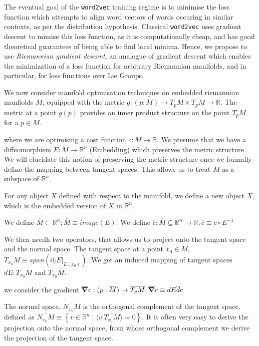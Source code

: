 \documentclass[11pt]{book}
\begin{document}

The eventual goal of the \texttt{word2vec} training regime is to minimise the loss function which attempts
to align word vectors of words occuring in similar contexts, as per the distribution hypothesis. Classical \texttt{word2vec}
uses gradient descent to mimise this loss function, as it is computationally cheap, and has good theoretical
guarantees of being able to find local minima. Hence, we propose to use \emph{Riemannian gradient descent}, an analogue
of gradient descent which enables the minimization of a loss function
for arbitrary Riemannian manifolds, and in particular, for loss functions over Lie Groups.

We now consider manifold optimisation techniques on embedded riemannian manfiolds $M$,
equipped with the metric $g: (p: M) \rightarrow T_p M  \times T_p M \rightarrow \mathbb R$.
The metric at a point $g(p)$ provides an inner product structure on the point $T_pM$
for a $p \in M$.

where we are optimising a cost function $c: M \rightarrow \mathbb R$.
We presume that we have a diffeomorphism $E: M \rightarrow \mathbb R^n$ (Embedding) which
preserves the metric structure. We will elucidate this notion of preserving
the metric structure once we formally define the mapping between tangent spaces.
This allows us to treat $M$ as a subspace of $\mathbb R^n$.

For any object $X$
defined with respect to the manifold, we define a new object $\overline X$, which
is the embedded version of $X$ in $\mathbb R^n$.

We define $\overline M \subset \mathbb R^n; \overline M \equiv image(E)$.
We define $\overline c: \overline M \subseteq \mathbb R^n \rightarrow \mathbb R; \overline c \equiv c \circ E^{-1}$

We then needh two operators, that allows us to project onto the tangent space
and the normal space. The tangent space at a point $x_0 \in M$, $\overline{T_{x_0} M} \equiv span(\partial_i E |_{E(x_0)})$.
We get an induced mapping of tangent spaces $dE: T_{x_0} M$ and $T_{x_0} \overline M$.

we consider the gradient
$\overline \grad c : (p: \overline M) \rightarrow \overline{T_p M}; \overline \grad c \equiv dE \overline dc$

The normal space,
$\overline{N_{x_0} M}$ is the orthogonal complement of the tangent space, defined
as $\overline{N_{x_0} M} \equiv \left\{ v \in \mathbb R^n \mid \langle v | \overline{T_{x_0} M} \rangle = 0 \right\}$.
It is often very easy to derive the projection onto the normal space, from
whose orthogonal complement we derive the projection of the tangent space.
\end{document}
